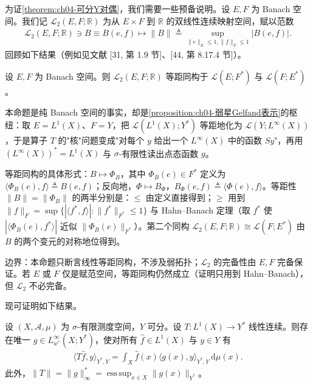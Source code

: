 \documentclass[../../main.tex]{subfiles}%
\begin{document}
为证\cref{theorem:ch04-可分Y对偶}，我们需要一些预备说明。设 $E,F$ 为 Banach 空间。我们记 $\mathcal{L}_2(E,F;\mathbb{R})$ 为从 $E\times F$ 到 $\mathbb{R}$ 的双线性连续映射空间，赋以范数
\begin{align*}
\mathcal{L}_2(E,F;\mathbb{R})\ni B\equiv B(e,f)\mapsto\|B\|\triangleq\sup_{\|e\|_E\leqslant1,\|f\|_F\leqslant1}|B(e,f)|.
\end{align*}
回顾如下结果（例如见文献 [31, 第 1.9 节]、[44, 第 8.17.4 节]）。

\begin{proposition}\label{proposition:ch04-双线性等距}
设 $E,F$ 为 Banach 空间。则 $\mathcal{L}_2(E,F;\mathbb{R})$ 等距同构于 $\mathcal{L}(E;F^*)$ 与 $\mathcal{L}(F;E^*)$。
\end{proposition}

\begin{remark}\label{remark:ch04-双线性等距}
本命题是纯 Banach 空间的事实，却是\cref{proposition:ch04-弱星Gelfand表示}的枢纽：取 $E=L^1(X)$、$F=Y$，把 $\mathcal{L}(L^1(X);Y^*)$ 等距地化为 $\mathcal{L}(Y;L^\infty(X))$，于是算子 $T$ 的"核"问题变成"对每个 $y$ 给出一个 $L^\infty(X)$ 中的函数 $Sy$"，再用 $(L^\infty(X))^*=L^1(X)$ 与 $\sigma$-有限性读出点态函数 $g$。

等距同构的具体形式：$B\mapsto\Phi_B$，其中 $\Phi_B(e)\in F^*$ 定义为 $\langle\Phi_B(e),f\rangle\triangleq B(e,f)$；反向地，$\Phi\mapsto B_\Phi$，$B_\Phi(e,f)\triangleq\langle\Phi(e),f\rangle$。等距性 $\|B\|=\|\Phi_B\|$ 的两半分别是：$\leqslant$ 由定义直接得到；$\geqslant$ 用到 $\|f\|_F=\sup\{|\langle f^*,f\rangle|:\|f^*\|_{F^*}\leqslant1\}$ 与 Hahn--Banach 定理（取 $f^*$ 使 $|\langle\Phi_B(e),f^*\rangle|$ 近似 $\|\Phi_B(e)\|_{F^*}$）。第二个同构 $\mathcal{L}_2(E,F;\mathbb{R})\cong\mathcal{L}(F;E^*)$ 由 $B$ 的两个变元的对称地位得到。

边界：本命题只断言线性等距同构，不涉及弱拓扑；$\mathcal{L}_2$ 的完备性由 $E,F$ 完备保证。若 $E$ 或 $F$ 仅是赋范空间，等距同构仍然成立（证明只用到 Hahn--Banach），但 $\mathcal{L}_2$ 不必完备。
\end{remark}

现可证明如下结果。

\begin{proposition}\label{proposition:ch04-弱星Gelfand表示}
设 $(X,\mathcal{A},\mu)$ 为 $\sigma$-有限测度空间，$Y$ 可分。设 $T:L^1(X)\to Y^*$ 线性连续。则存在唯一 $g\in L^\infty_{w^*}(X;Y^*)$，使对所有 $\hat f\in L^1(X)$ 与 $y\in Y$ 有
\begin{align}
\langle T\hat f,y\rangle_{Y^*,Y}=\int_X\hat f(x)\langle g(x),y\rangle_{Y^*,Y}\,\mathrm{d}\mu(x). \label{align:ch04-4.110}
\end{align}
此外，$\|T\|=\|g\|_\infty^*=\operatorname*{ess\,sup}_{x\in X}\|g(x)\|_{Y^*}$。
\end{proposition}
\end{document}
